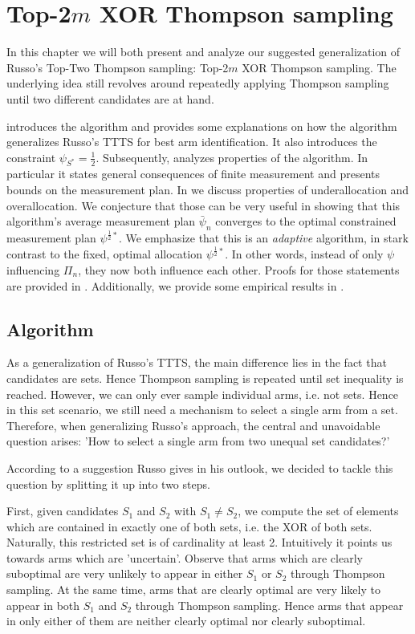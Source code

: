 \chapter{Top-2$m$ XOR Thompson sampling}\label{chapter:algorithm}

In this chapter we will both present and analyze our suggested generalization of
Russo's Top-Two Thompson sampling: Top-2$m$ XOR Thompson sampling. The
underlying idea still revolves around repeatedly applying Thompson sampling
until two different candidates are at hand.

 introduces the algorithm and provides some explanations
on how the algorithm generalizes Russo's TTTS for best arm identification. It
also introduces the constraint $\psi_{S^*} = \frac{1}{2}$. Subsequently,
 analyzes properties of the algorithm. In particular it
states general consequences of finite measurement and presents bounds on the
measurement plan. In  we discuss properties of
underallocation and overallocation. We conjecture that those can be very useful
in showing that this algorithm's average measurement plan $\bar{\psi}_n$
converges to the optimal constrained measurement plan $\psi^{\frac{1}{2}*}$. We
emphasize that this is an \emph{adaptive} algorithm, in stark contrast to the
fixed, optimal allocation $\psi^{\frac{1}{2}*}$. In other words, instead of only
$\psi$ influencing $\Pi_n$, they now both influence each other. Proofs for those
statements are provided in . Additionally, we provide
some empirical results in .

\section{Algorithm}\label{section:algorithm}
As a generalization of Russo's TTTS, the main difference lies in the fact that
candidates are sets. Hence Thompson sampling is repeated until set inequality is
reached. However, we can only ever sample individual arms, i.e. not sets. Hence
in this set scenario, we still need a mechanism to select a single arm from a
set. Therefore, when generalizing Russo's approach, the central and unavoidable
question arises: 'How to select a single arm from two unequal set candidates?'

According to a suggestion Russo gives in his outlook, we decided to tackle this
question by splitting it up into two steps.

First, given candidates $S_1$ and $S_2$ with $S_1 \neq S_2$, we compute the set
of elements which are contained in exactly one of both sets, i.e. the XOR of
both sets. Naturally, this restricted set is of cardinality at least 2.
Intuitively it points us towards arms which are 'uncertain'. Observe that arms
which are clearly suboptimal are very unlikely to appear in either $S_1$ or
$S_2$ through Thompson sampling. At the same time, arms that are clearly optimal
are very likely to appear in both $S_1$ and $S_2$ through Thompson sampling.
Hence arms that appear in only either of them are neither clearly optimal nor
clearly suboptimal.

